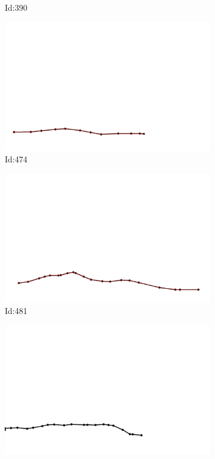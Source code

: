 \documentclass[12pt,twoside]{report}
\begin{document}
\begin{figure}
\begin{subfigure}[b]{0.20\textwidth}
\caption{Id:390}
\end{subfigure}
\begin{subfigure}[b]{0.20\textwidth}
\centering
\includegraphics[width=\textwidth]{../trajectories/474.png}
\caption{Id:474}
\end{subfigure}
\begin{subfigure}[b]{0.20\textwidth}
\centering
\includegraphics[width=\textwidth]{../trajectories/481.png}
\caption{Id:481}
\end{subfigure}
\begin{subfigure}[b]{0.20\textwidth}
\centering
\includegraphics[width=\textwidth]{../trajectories/490.png}

\end{subfigure}
\end{figure}
\end{document}
